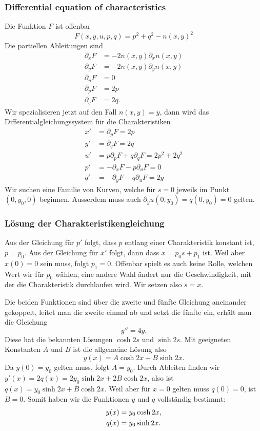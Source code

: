 \subsubsection{Differential equation of characteristics}
Die Funktion $F$ ist offenbar
\[
F(x,y,u,p,q)=p^2+q^2-n(x,y)^2
\]
Die partiellen Ableitungen sind
\begin{align*}
\partial_xF&=-2n(x,y)\partial_x n(x,y)\\
\partial_yF&=-2n(x,y)\partial_y n(x,y)\\
\partial_uF&=0\\
\partial_pF&=2p\\
\partial_qF&=2q.
\end{align*}
Wir spezialisieren jetzt auf den Fall $n(x,y)=y$, dann wird das 
Differentialgleichungssystem für die Charakteristiken
\begin{align*}
x'&=\partial_pF=2p\\
y'&=\partial_qF=2q\\
u'&=p\partial_pF+q\partial_qF=2p^2+2q^2\\
p'&=-\partial_xF-p\partial_uF=0\\
q'&=-\partial_yF-q\partial_uF=2y
\end{align*}
Wir suchen eine Familie von Kurven, welche für $s=0$ jeweils
im Punkt $(0,y_0,0)$ beginnen.
Ausserdem muss auch $\partial_yu(0,y_0)=q(0,y_0)=0$ gelten.

\subsubsection{Lösung der Charakteristikengleichung}
Aus der Gleichung für $p'$ folgt, dass $p$ entlang einer Charakteristik
konstant ist, $p=p_0$. Aus der Gleichung für $x'$ folgt, dann
dass $x=p_0s+p_1$ ist. Weil aber $x(0)=0$ sein muss, folgt $p_1=0$.
Offenbar spielt es auch keine Rolle, welchen Wert wir für $p_0$
wählen, eine andere Wahl ändert nur die Geschwindigkeit, mit der
die Charakteristik durchlaufen wird. Wir setzen also $s=x$.

Die beiden Funktionen sind über die zweite und fünfte Gleichung
aneinander gekoppelt, leitet man die zweite einmal ab und setzt die
fünfte ein, erhält man die Gleichung
\[
y''=4y.
\]
Diese hat die bekannten Lösungen $\cosh 2s$ und $\sinh 2s$.
Mit geeigneten Konstanten $A$ und $B$ ist die allgemeine
Lösung also
\[
y(x)=A\cosh 2x + B\sinh 2x.
\]
Da $y(0)=y_0$ gelten muss, folgt $A=y_0$. Durch Ableiten finden wir
$y'(x)=2q(x)=2y_0\sinh 2x + 2B\cosh 2x$, also ist $q(x)=y_0\sinh 2x+B\cosh 2x$. 
Weil aber für $x=0$ gelten muss $q(0)=0$, ist $B=0$.
Somit haben wir die Funktionen $y$ und $q$ vollständig bestimmt:
\begin{align}
y(x)&=y_0\cosh 2x,
\label{nichtlinear:y}
\\
q(x)&=y_0\sinh 2x.\notag
\end{align}

